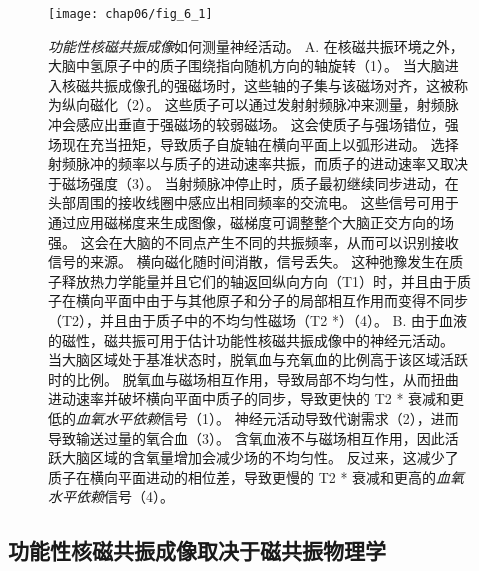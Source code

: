 \begin{figure}[htbp]
	\centering
	\texttt{[image: chap06/fig\_6\_1]}
	\caption{\textit{功能性核磁共振成像}如何测量神经活动。
		A. 在核磁共振环境之外，大脑中氢原子中的质子围绕指向随机方向的轴旋转（1）。
		当大脑进入核磁共振成像孔的强磁场时，这些轴的子集与该磁场对齐，这被称为纵向磁化（2）。
		这些质子可以通过发射射频脉冲来测量，射频脉冲会感应出垂直于强磁场的较弱磁场。
		这会使质子与强场错位，强场现在充当扭矩，导致质子自旋轴在横向平面上以弧形进动。
		选择射频脉冲的频率以与质子的进动速率共振，而质子的进动速率又取决于磁场强度（3）。
		当射频脉冲停止时，质子最初继续同步进动，在头部周围的接收线圈中感应出相同频率的交流电。
		这些信号可用于通过应用磁梯度来生成图像，磁梯度可调整整个大脑正交方向的场强。
		这会在大脑的不同点产生不同的共振频率，从而可以识别接收信号的来源。
		横向磁化随时间消散，信号丢失。
		这种弛豫发生在质子释放热力学能量并且它们的轴返回纵向方向（T1）时，并且由于质子在横向平面中由于与其他原子和分子的局部相互作用而变得不同步（T2），并且由于质子中的不均匀性磁场（T2 *）（4）。
		B. 由于血液的磁性，磁共振可用于估计功能性核磁共振成像中的神经元活动。
		当大脑区域处于基准状态时，脱氧血与充氧血的比例高于该区域活跃时的比例。
		脱氧血与磁场相互作用，导致局部不均匀性，从而扭曲进动速率并破坏横向平面中质子的同步，导致更快的 T2 * 衰减和更低的\textit{血氧水平依赖}信号（1）。
		神经元活动导致代谢需求（2），进而导致输送过量的氧合血（3）。
		含氧血液不与磁场相互作用，因此活跃大脑区域的含氧量增加会减少场的不均匀性。
		反过来，这减少了质子在横向平面进动的相位差，导致更慢的 T2 * 衰减和更高的\textit{血氧水平依赖}信号（4）。}
	\label{fig:6_1}
\end{figure}



\subsection{功能性核磁共振成像取决于磁共振物理学}

